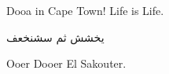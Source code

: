 \documentclass[10pt,a4paper]{article}
\author{Doaa}
\begin{document}

Dooa in Cape Town! Life is Life.

\begin{otherlanguage}{arabic}
يخشش ثم سشنخعف
\end{otherlanguage}

Ooer Dooer El Sakouter.
\end{document}
